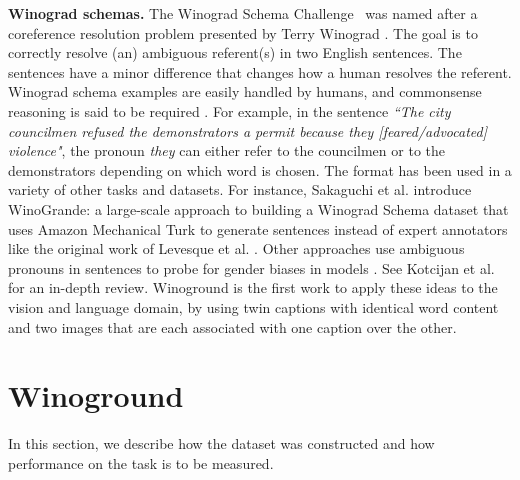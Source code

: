 \documentclass[10pt,twocolumn,letterpaper]{article}
\begin{document}
\textbf{Winograd schemas.} The Winograd Schema Challenge~\cite{levesque2012winograd} was named after a coreference resolution problem presented by Terry Winograd \cite{winograd1972understanding}. The goal is to correctly resolve (an) ambiguous referent(s) in two English sentences. The sentences have a minor difference that changes how a human resolves the referent. Winograd schema examples are easily handled by humans, and commonsense reasoning is said to be required \cite{bender2015establishing}.
For example, in the sentence \textit{``The city councilmen refused the demonstrators a permit because they [feared/advocated] violence"}, the pronoun \textit{they} can either refer to the councilmen or to the demonstrators depending on which word is chosen.
The format has been used in a variety of other tasks and datasets. For instance, Sakaguchi et al.\cite{sakaguchi2020winogrande} introduce WinoGrande: a large-scale approach to building a Winograd Schema dataset that uses Amazon Mechanical Turk to generate sentences instead of expert annotators like the original work of Levesque et al. \cite{levesque2012winograd}.
Other approaches use ambiguous pronouns in sentences to probe for gender biases in models \cite{rudinger2018gender,zhao2018gender}.
See Kotcijan et al. \cite{kocijan2020review} for an in-depth review. Winoground is the first work to apply these ideas to the vision and language domain, by using twin captions with identical word content and two images that are each associated with one caption over the other. 










\section{Winoground}

In this section, we describe how the dataset was constructed and how performance on the task is to be measured.
\end{document}
